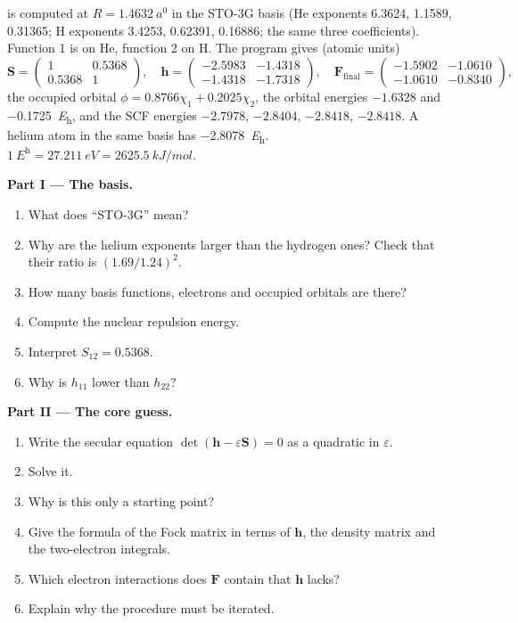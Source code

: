 \begin{problem}
\label{pb:b3:computational-chemistry:1}
 is computed at $R = \qty{1.4632}{\bohr}$ in the STO-3G basis (He
exponents 6.3624, 1.1589, 0.31365; H exponents 3.4253, 0.62391, 0.16886; the
same three coefficients). Function 1 is on He, function 2 on H. The program
gives (atomic units)
\[
\mathbf S = \begin{pmatrix}1 & 0.5368\\ 0.5368 & 1\end{pmatrix},\quad
\mathbf h = \begin{pmatrix}-2.5983 & -1.4318\\ -1.4318 & -1.7318\end{pmatrix},\quad
\mathbf F_{\mathrm{final}} = \begin{pmatrix}-1.5902 & -1.0610\\ -1.0610 & -0.8340
\end{pmatrix},
\]
the occupied orbital $\phi = 0.8766\chi_1 + 0.2025\chi_2$, the orbital energies
$-1.6328$ and \qty{-0.1725}{\hartree}, and the SCF energies $-2.7978$, $-2.8404$,
$-2.8418$, $-2.8418$. A helium atom in the same basis has
\qty{-2.8078}{\hartree}. $\qty{1}{\hartree} = \qty{27.211}{eV} =
\qty{2625.5}{kJ/mol}$.

\medskip\noindent\textbf{Part I --- The basis.}
\begin{enumerate}
  \item What does ``STO-3G'' mean?
  \item Why are the helium exponents larger than the hydrogen ones? Check
        that their ratio is $(1.69/1.24)^2$.
  \item How many basis functions, electrons and occupied orbitals are there?
  \item Compute the nuclear repulsion energy.
  \item Interpret $S_{12} = 0.5368$.
  \item Why is $h_{11}$ lower than $h_{22}$?
\end{enumerate}

\medskip\noindent\textbf{Part II --- The core guess.}
\begin{enumerate}[resume]
  \item Write the secular equation $\det(\mathbf h - \varepsilon\mathbf S) = 0$ as a
        quadratic in $\varepsilon$.
  \item Solve it.
  \item Why is this only a starting point?
  \item Give the formula of the Fock matrix in terms of $\mathbf h$, the
        density matrix and the two-electron integrals.
  \item Which electron interactions does $\mathbf F$ contain that $\mathbf h$ lacks?
  \item Explain why the procedure must be iterated.
\end{enumerate}


\end{problem}

